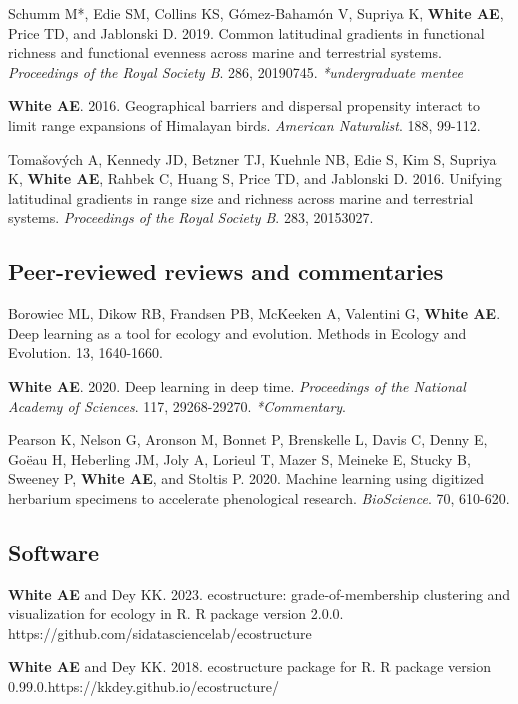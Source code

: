 \documentclass[letterpaper]{article}
\newenvironment{biblist}{%
   \begin{list}{}{%
     \setlength{\labelwidth}{0pt}%
     \setlength{\labelsep}{1em}%
     \setlength{\leftmargin}{2em}%
     \setlength{\itemindent}{-1em}%
   }
}{\end{list}}
\begin{document}
\begin{biblist}
\item  Schumm M*, Edie SM, Collins KS, Gómez-Bahamón V, Supriya K, \textbf{White AE}, Price TD, and Jablonski D. 2019. Common latitudinal gradients in functional richness and functional evenness across marine and terrestrial systems. \textit{Proceedings of the Royal Society B}. 286, 20190745. \textit{*undergraduate mentee}

\item \textbf{White AE}. 2016. Geographical barriers and dispersal propensity interact to limit range expansions of Himalayan birds. \textit{American Naturalist}. 188, 99-112.

\item  Tomašových A, Kennedy JD, Betzner TJ,  Kuehnle NB, Edie S, Kim S, Supriya K, \textbf{White AE}, Rahbek C, Huang S, Price TD, and Jablonski D. 2016. Unifying latitudinal gradients in range size and  richness across marine and terrestrial systems. \textit{Proceedings of the Royal Society B}. 283, 20153027.
\end{biblist}

\subsection*{Peer-reviewed reviews and commentaries}
\begin{biblist}
\item Borowiec ML, Dikow RB, Frandsen PB, McKeeken A, Valentini G, \textbf{White AE}. Deep learning as a tool for ecology and evolution. Methods in Ecology and Evolution. 13, 1640-1660.

\item \textbf{White AE}. 2020. Deep learning in deep time. \textit{Proceedings of the National Academy of Sciences}. 117, 29268-29270. \textit{*Commentary}.

\item Pearson K, Nelson G, Aronson M, Bonnet P, Brenskelle L, Davis C, Denny E, Goëau H, Heberling JM, Joly A, Lorieul T, Mazer S, Meineke E, Stucky B, Sweeney P,\textbf{ White AE}, and Stoltis P. 2020. Machine learning using digitized herbarium specimens to accelerate phenological research. \textit{BioScience}. 70, 610-620.
\end{biblist}

\subsection*{Software}
\begin{biblist}
\item \textbf{White AE} and Dey KK. 2023. ecostructure: grade-of-membership clustering and visualization for ecology in R. R package version 2.0.0. https://github.com/sidatasciencelab/ecostructure

\item \textbf{White AE} and Dey KK. 2018. ecostructure package for R. R package version 0.99.0.\newline https://kkdey.github.io/ecostructure/

\end{biblist}
\end{document}
